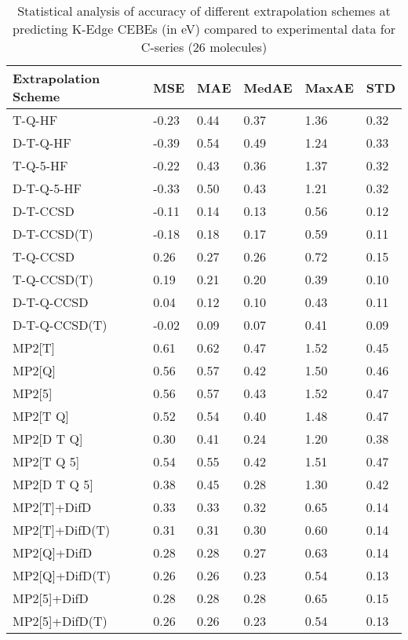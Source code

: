 \begin{table}
  \caption{Statistical analysis of accuracy of different extrapolation schemes at predicting K-Edge CEBEs (in eV) compared to experimental data for C-series (26 molecules)}
  \label{tbl:summary-c}
  \begin{tabular}{l l l l l l }
    \toprule
    \textbf{Extrapolation Scheme} & \textbf{MSE} & \textbf{MAE} & \textbf{MedAE} & \textbf{MaxAE} & \textbf{STD} \\ 
    \midrule
    T-Q-HF & -0.23 & 0.44 & 0.37 & 1.36 & 0.32 \\ 
    D-T-Q-HF & -0.39 & 0.54 & 0.49 & 1.24 & 0.33 \\ 
    T-Q-5-HF & -0.22 & 0.43 & 0.36 & 1.37 & 0.32 \\ 
    D-T-Q-5-HF & -0.33 & 0.50 & 0.43 & 1.21 & 0.32 \\ 
    D-T-CCSD & -0.11 & 0.14 & 0.13 & 0.56 & 0.12 \\ 
    D-T-CCSD(T) & -0.18 & 0.18 & 0.17 & 0.59 & 0.11 \\ 
    T-Q-CCSD & 0.26 & 0.27 & 0.26 & 0.72 & 0.15 \\ 
    T-Q-CCSD(T) & 0.19 & 0.21 & 0.20 & 0.39 & 0.10 \\ 
    D-T-Q-CCSD & 0.04 & 0.12 & 0.10 & 0.43 & 0.11 \\ 
    D-T-Q-CCSD(T) & -0.02 & 0.09 & 0.07 & 0.41 & 0.09 \\ 
    MP2[T] & 0.61 & 0.62 & 0.47 & 1.52 & 0.45 \\ 
    MP2[Q] & 0.56 & 0.57 & 0.42 & 1.50 & 0.46 \\ 
    MP2[5] & 0.56 & 0.57 & 0.43 & 1.52 & 0.47 \\ 
    MP2[T Q] & 0.52 & 0.54 & 0.40 & 1.48 & 0.47 \\ 
    MP2[D T Q] & 0.30 & 0.41 & 0.24 & 1.20 & 0.38 \\ 
    MP2[T Q 5] & 0.54 & 0.55 & 0.42 & 1.51 & 0.47 \\ 
    MP2[D T Q 5] & 0.38 & 0.45 & 0.28 & 1.30 & 0.42 \\ 
    MP2[T]+DifD & 0.33 & 0.33 & 0.32 & 0.65 & 0.14 \\ 
    MP2[T]+DifD(T) & 0.31 & 0.31 & 0.30 & 0.60 & 0.14 \\ 
    MP2[Q]+DifD & 0.28 & 0.28 & 0.27 & 0.63 & 0.14 \\ 
    MP2[Q]+DifD(T) & 0.26 & 0.26 & 0.23 & 0.54 & 0.13 \\ 
    MP2[5]+DifD & 0.28 & 0.28 & 0.28 & 0.65 & 0.15 \\ 
    MP2[5]+DifD(T) & 0.26 & 0.26 & 0.23 & 0.54 & 0.13 \\ 

\end{tabular}
\end{table}
